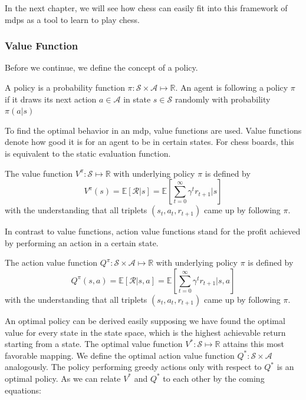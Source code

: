 In the next chapter, we will see how chess can easily fit into this framework of \gls{mdp}s as a tool to learn to play chess.

\subsubsection*{Value Function}
Before we continue, we define the concept of a policy.
\begin{definition}
A policy is a probability function $\pi:\mathcal{S} \times \mathcal{A} \mapsto \mathbb{\mathbb{R}}$. An agent is following a policy $\pi$ if it draws its next action $a \in \mathcal{A}$ in state $s \in \mathcal{S}$  randomly with probability $\pi(a|s)$
\end{definition}
To find the optimal behavior in an \gls{mdp}, value functions are used. Value functions denote how good it is for an agent to be in certain states. For chess boards, this is equivalent to the static evaluation function.
\begin{definition}
The value function $V^{\pi}:\mathcal{S}\mapsto\mathbb{R}$ with underlying policy $\pi$ is defined by
\begin{equation}
V^{\pi}(s) = \mathbb{E}\left[\mathcal{R}|s\right] = \mathbb{E}\left[\sum_{t=0}^{\infty}\gamma^t r_{t+1}|s\right]
\label{eq:v}
\end{equation}
with the understanding that all triplets $(s_t,a_t,r_{t+1})$ came up by following $\pi$.
\end{definition}

In contrast to value functions, action value functions stand for the profit achieved by performing an action in a certain state.

\begin{definition}
The action value function $Q^{\pi}:\mathcal{S} \times \mathcal{A} \mapsto\mathbb{R}$ with underlying policy $\pi$ is defined by
\begin{equation}
Q^{\pi}(s,a) = \mathbb{E}\left[\mathcal{R}|s,a\right] = \mathbb{E}\left[\sum_{t=0}^{\infty}\gamma^t r_{t+1}|s,a\right]
\end{equation}
with the understanding that all triplets $(s_t,a_t,r_{t+1})$ came up by following $\pi$.
\end{definition}

An optimal policy can be derived easily supposing we have found the optimal value for every state in the state space, which is the highest achievable return starting from a state. The optimal value function $V^*:\mathcal{S}\mapsto\mathbb{R}$ attains this most favorable mapping. We define the optimal action value function $Q^{*}:\mathcal{S} \times \mathcal{A}$ analogously. The policy performing greedy actions only with respect to $Q^*$ is an optimal policy. As we can relate $V^*$ and $Q^*$ to each other by the coming equations:

